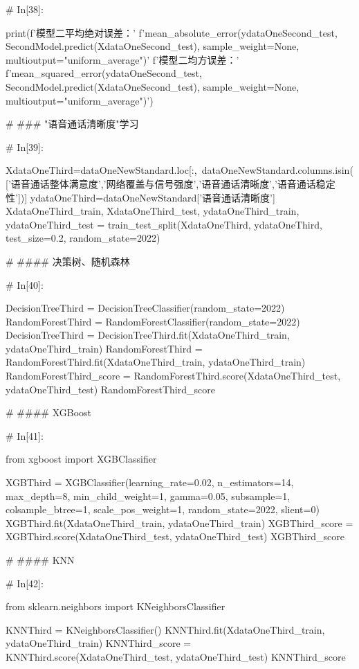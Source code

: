 \documentclass{MathorCupmodeling}
\begin{document}
\begin{python}
# In[38]:


print(f'模型二平均绝对误差：'
      f'{mean_absolute_error(ydataOneSecond_test, SecondModel.predict(XdataOneSecond_test), sample_weight=None, multioutput="uniform_average")}\n'
      f'模型二均方误差：'
      f'{mean_squared_error(ydataOneSecond_test, SecondModel.predict(XdataOneSecond_test), sample_weight=None, multioutput="uniform_average")}')


# ### "语音通话清晰度"学习

# In[39]:


XdataOneThird=dataOneNewStandard.loc[:,~dataOneNewStandard.columns.isin(['语音通话整体满意度','网络覆盖与信号强度','语音通话清晰度','语音通话稳定性'])]
ydataOneThird=dataOneNewStandard['语音通话清晰度']
XdataOneThird_train, XdataOneThird_test, ydataOneThird_train, ydataOneThird_test = train_test_split(XdataOneThird, ydataOneThird, test_size=0.2, random_state=2022)


# #### 决策树、随机森林

# In[40]:


DecisionTreeThird = DecisionTreeClassifier(random_state=2022)
RandomForestThird = RandomForestClassifier(random_state=2022)
DecisionTreeThird = DecisionTreeThird.fit(XdataOneThird_train, ydataOneThird_train)
RandomForestThird = RandomForestThird.fit(XdataOneThird_train, ydataOneThird_train)
RandomForestThird_score = RandomForestThird.score(XdataOneThird_test, ydataOneThird_test)
RandomForestThird_score


# #### XGBoost

# In[41]:


from xgboost import XGBClassifier

XGBThird = XGBClassifier(learning_rate=0.02,
                         n_estimators=14,
                         max_depth=8,
                         min_child_weight=1,
                         gamma=0.05,
                         subsample=1,
                         colsample_btree=1,
                         scale_pos_weight=1,
                         random_state=2022,
                         slient=0)
XGBThird.fit(XdataOneThird_train, ydataOneThird_train)
XGBThird_score = XGBThird.score(XdataOneThird_test, ydataOneThird_test)
XGBThird_score


# #### KNN

# In[42]:


from sklearn.neighbors import KNeighborsClassifier

KNNThird = KNeighborsClassifier()
KNNThird.fit(XdataOneThird_train, ydataOneThird_train)
KNNThird_score = KNNThird.score(XdataOneThird_test, ydataOneThird_test)
KNNThird_score



\end{python}
\end{document}
